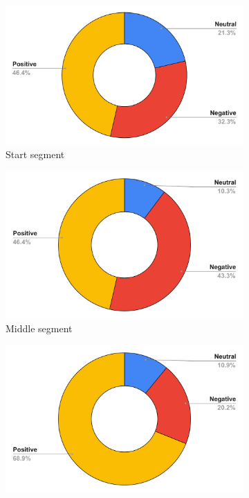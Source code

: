 \begin{figure}
\begin{subfigure}{.33\textwidth}
  \centering
  \includegraphics[width=\linewidth]{figures/start_tone_vs_social_message.pdf}
  \caption{Start segment}
  \label{start_tone_social_message}
\end{subfigure}%
\begin{subfigure}{.33\textwidth}
  \centering
  \includegraphics[width=\linewidth]{figures/middle_tone_vs_social_message.pdf}
  \caption{Middle segment}
  \label{mid_tone_social_message}
\end{subfigure}
\begin{subfigure}{.33\textwidth}
  \centering
  \includegraphics[width=\linewidth]{figures/ending_tone_vs_social_message.pdf}

\end{subfigure}
\end{figure}
